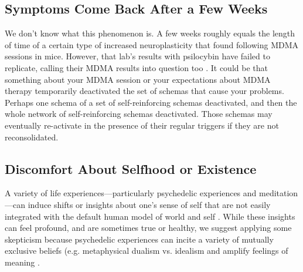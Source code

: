 \documentclass[12pt,letterpaper]{book}
\begin{document}
\subsection*{Symptoms Come Back After a Few Weeks}
We don't know what this phenomenon is. A few weeks roughly equals the length of time of a certain type of increased neuroplasticity that \textcite{nardouMDMAPlasticity} found following MDMA sessions in mice. However, that lab's results with psilocybin have failed to replicate, calling their MDMA results into question too \cite{Lu2025noplasticity}. It could be that something about your MDMA session or your expectations about MDMA therapy temporarily deactivated the set of schemas that cause your problems. Perhaps one schema of a set of self-reinforcing schemas deactivated, and then the whole network of self-reinforcing schemas deactivated. Those schemas may eventually re-activate in the presence of their regular triggers if they are not reconsolidated.
\label{selfinsight}
\subsection*{Discomfort About Selfhood or Existence}
A variety of life experiences—particularly psychedelic experiences and meditation—can induce shifts or insights about one's sense of self that are not easily integrated with the default human model of world and self \cite{evans2020}. While these insights can feel profound, and are sometimes true or healthy, we suggest applying some skepticism because psychedelic experiences can incite a variety of mutually exclusive beliefs (e.g. metaphysical dualism vs. idealism  \cite{timmermann2021metaphysics} and amplify feelings of meaning \cite{hartogsohn2018meaning}.
\end{document}
